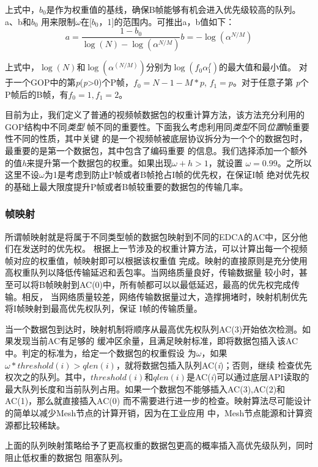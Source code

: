 上式中，$b_{0}$是作为权重值的基线，确保B帧能够有机会进入优先级较高的队列。a、b和$b_{0}$
用来限制$\omega$在[$b_{0}$，1]的范围内。可推出a，b值如下：
\begin{equation}
a = \frac{1-b_{0}}{\log(N) - \log(\alpha^{N/M})}
b = -\log(\alpha^{N/M})
\end{equation}

上式中，$\log(N)$和$\log(\alpha^(N/M))$分别为$\log(f_{0}\alpha^f_{1})$的最大值和最小值。
对于一个GOP中的第\emph{p}(\emph{p}>0)个P帧，$f_{0}=N-1-M*p$, $f_{1}=p$。对于任意子第
\emph{p}个P帧后的B帧，有$f_{0}=1, f_{1}=2$。

目前为止，我们定义了普通的视频帧数据包的权重计算方法，该方法充分利用的GOP结构中不同\emph{类型}
帧不同的重要性。下面我么考虑利用同\emph{类型}不同\emph{位置}帧重要性不同的性质，其中关键
的是一个视频帧被底层协议拆分为一个个的数据包时，最重要的是第一个数据包，其中包含了编码重要
的信息。我们选择添加一个额外的值\emph{h}来提升第一个数据包的权重。如果出现$\omega+h>1$，就设置
$\omega=0.99$。之所以这里不设$\omega$为1是考虑到防止P帧或者B帧抢占I帧的优先权，在保证I帧
绝对优先权的基础上最大限度提升P帧或者B帧较重要的数据包的传输几率。

\subsubsection{帧映射}
所谓帧映射就是将属于不同类型帧的数据包映射到不同的EDCA的AC中，区分他们在发送时的优先权。
根据上一节涉及的权重计算方法，可以计算出每一个视频帧对应的权重值，帧映射即可以根据该权重值
完成。映射的直接原则是充分使用高权重队列以降低传输延迟和丢包率。当网络质量良好，传输数据量
较小时，甚至可以将B帧映射到AC(0)中，所有帧都可以以最低延迟，最高的优先权完成传输。相反，
当网络质量较差，网络传输数据量过大，造撑拥堵时，映射机制优先将I帧映射到最高优先权队列，保证
I帧的传输质量。

当一个数据包到达时，映射机制将顺序从最高优先权队列AC(3)开始依次检测。如果发现当前AC有足够的
缓冲区余量，且满足映射标准，即将数据包插入该AC中。判定的标准为，给定一个数据包的权重假设
为$\omega$，如果$\omega*threshold(i)>qlen(i)$，就将数据包插入队列AC(\emph{i})；否则，继续
检查优先权次之的队列。其中，$threshold(i)$和$qlen(i)$是AC(\emph{i})可以通过底层API读取的
最大队列长度和当前队列占用。如果一个数据包不能够插入AC(3),AC(2)和AC(1)，那么就直接插入AC(0)
而不需要进行进一步的检查。映射算法尽可能设计的简单以减少Mesh节点的计算开销，因为在工业应用
中，Mesh节点能源和计算资源都比较稀缺。

上面的队列映射策略给予了更高权重的数据包更高的概率插入高优先级队列，同时阻止低权重的数据包
阻塞队列。

